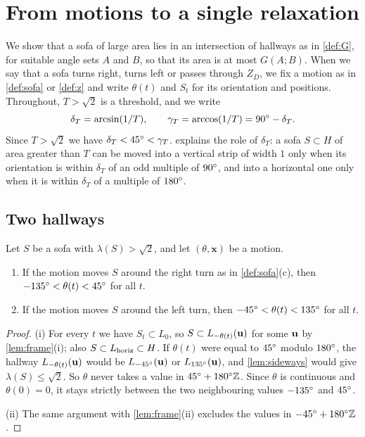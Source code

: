 \section{From motions to a single relaxation}\label{sec:reduction}

We show that a sofa of large area lies in an intersection of hallways as in \cref{def:G}, for suitable angle sets $A$ and $B$, so that its area is at most $G(A;B)$. When we say that a sofa turns right, turns left or passes through $Z_D$, we fix a motion as in \cref{def:sofa} or \cref{def:z} and write $\theta(t)$ and $S_t$ for its orientation and positions. Throughout, $T>\sqrt2$ is a threshold, and we write
\[
\delta_T=\arcsin(1/T), \qquad \gamma_T=\arccos(1/T)=90^{\circ}-\delta_T .
\]
Since $T>\sqrt2$ we have $\delta_T<45^{\circ}<\gamma_T$.  explains the role of $\delta_T$: a sofa $S\subset H$ of area greater than $T$ can be moved into a vertical strip of width $1$ only when its orientation is within $\delta_T$ of an odd multiple of $90^{\circ}$, and into a horizontal one only when it is within $\delta_T$ of a multiple of $180^{\circ}$.

\subsection{Two hallways}\label{sec:twocorridors}

\begin{lem}\label{lem:noside}
Let $S$ be a sofa with $\lambda(S)>\sqrt2$, and let $(\theta,\mathbf{x})$ be a motion.
\begin{enumerate}[label=(\roman*)]
\item If the motion moves $S$ around the right turn as in \cref{def:sofa}(c), then $-135^{\circ}<\theta(t)<45^{\circ}$ for all $t$.
\item If the motion moves $S$ around the left turn, then $-45^{\circ}<\theta(t)<135^{\circ}$ for all $t$.
\end{enumerate}
\end{lem}

\begin{proof}
(i) For every $t$ we have $S_t\subset L_0$, so $S\subset L_{-\theta(t)}(\mathbf{u})$ for some $\mathbf{u}$ by \cref{lem:frame}(i); also $S\subset L_{\mathrm{horiz}}\subset H$. If $\theta(t)$ were equal to $45^{\circ}$ modulo $180^{\circ}$, the hallway $L_{-\theta(t)}(\mathbf{u})$ would be $L_{-45^{\circ}}(\mathbf{u})$ or $L_{135^{\circ}}(\mathbf{u})$, and \cref{lem:sideways} would give $\lambda(S)\le\sqrt2$. So $\theta$ never takes a value in $45^{\circ}+180^{\circ}\mathbb{Z}$. Since $\theta$ is continuous and $\theta(0)=0$, it stays strictly between the two neighbouring values $-135^{\circ}$ and $45^{\circ}$.

(ii) The same argument with \cref{lem:frame}(ii) excludes the values in $-45^{\circ}+180^{\circ}\mathbb{Z}$.
\end{proof}

